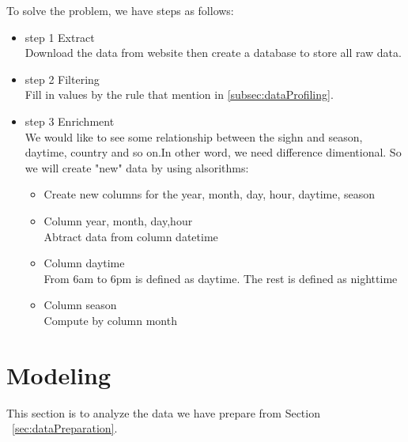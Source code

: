 \documentclass[11pt, journal]{IEEEtran}
\begin{document}
To solve the problem, we have steps as follows:
\begin{itemize}
  \item step 1 Extract \\
  Download the data from website then create a database to store all raw data.
  \item step 2 Filtering\\
  Fill in values by the rule that mention in \ref{subsec:dataProfiling}.
  \item step 3 Enrichment\\
  We would like to see some relationship between the sighn and season, daytime, country and so on.In other word, we need difference dimentional. So we will create "new" data by using alsorithms:
  \begin{itemize}
      \item Create new columns for the year, month, day, hour, daytime, season
      \item Column year, month, day,hour\\
      Abtract data from column datetime
      \item Column daytime\\
      From 6am to 6pm is defined as daytime. The rest is defined as nighttime
      \item Column season\\
      Compute by column month
  \end{itemize}
  
\end{itemize}

\section{Modeling} \label{sec:modeling}
This section is to analyze the data we have prepare from Section ~\ref{sec:dataPreparation}.
\end{document}
